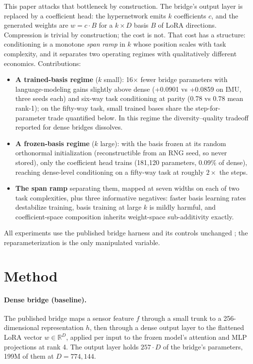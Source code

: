 \documentclass[11pt]{article}
\begin{document}
This paper attacks that bottleneck by construction. The bridge's output layer is replaced by a coefficient head: the hypernetwork emits $k$ coefficients $c$, and the generated weights are $w = c \cdot B$ for a $k \times D$ basis $B$ of LoRA directions. Compression is trivial by construction; the cost is not. That cost has a structure: conditioning is a monotone \emph{span ramp} in $k$ whose position scales with task complexity, and it separates two operating regimes with qualitatively different economics. Contributions:
\begin{itemize}
  \item \textbf{A trained-basis regime} ($k$ small): 16$\times$ fewer bridge parameters with language-modeling gains slightly above dense (+0.0901 vs +0.0859 on IMU, three seeds each) and six-way task conditioning at parity (0.78 vs 0.78 mean rank-1); on the fifty-way task, small trained bases share the step-for-parameter trade quantified below. In this regime the diversity--quality tradeoff reported for dense bridges dissolves.
  \item \textbf{A frozen-basis regime} ($k$ large): with the basis frozen at its random orthonormal initialization (reconstructible from an RNG seed, so never stored), only the coefficient head trains (181,120 parameters, 0.09\% of dense), reaching dense-level conditioning on a fifty-way task at roughly $2\times$ the steps.
  \item \textbf{The span ramp} separating them, mapped at seven widths on each of two task complexities, plus three informative negatives: faster basis learning rates destabilize training, basis training at large $k$ is mildly harmful, and coefficient-space composition inherits weight-space sub-additivity exactly.
\end{itemize}
All experiments use the published bridge harness and its controls unchanged \cite{penov2026bridges,penov2026note}; the reparameterization is the only manipulated variable.

\section{Method}
\paragraph{Dense bridge (baseline).}
The published bridge maps a sensor feature $f$ through a small trunk to a 256-dimensional representation $h$, then through a dense output layer to the flattened LoRA vector $w \in \mathbb{R}^D$, applied per input to the frozen model's attention and MLP projections at rank 4. The output layer holds $257 \cdot D$ of the bridge's parameters, 199M of them at $D = 774,144$.
\end{document}
